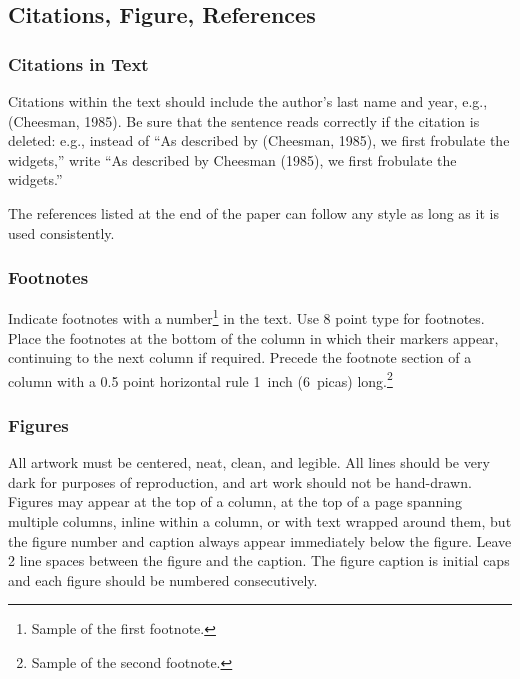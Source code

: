 \documentclass[twoside]{article}
\begin{document}
\subsection{Citations, Figure, References}


\subsubsection{Citations in Text}

Citations within the text should include the author's last name and
year, e.g., (Cheesman, 1985). 
Be sure that the sentence reads
correctly if the citation is deleted: e.g., instead of ``As described
by (Cheesman, 1985), we first frobulate the widgets,'' write ``As
described by Cheesman (1985), we first frobulate the widgets.''


The references listed at the end of the paper can follow any style as long as it is used consistently.


\subsubsection{Footnotes}

Indicate footnotes with a number\footnote{Sample of the first
  footnote.} in the text. Use 8 point type for footnotes. Place the
footnotes at the bottom of the column in which their markers appear,
continuing to the next column if required. Precede the footnote
section of a column with a 0.5 point horizontal rule 1~inch (6~picas)
long.\footnote{Sample of the second footnote.}

\subsubsection{Figures}

All artwork must be centered, neat, clean, and legible.  All lines
should be very dark for purposes of reproduction, and art work should
not be hand-drawn.  Figures may appear at the top of a column, at the
top of a page spanning multiple columns, inline within a column, or
with text wrapped around them, but the figure number and caption
always appear immediately below the figure.  Leave 2 line spaces
between the figure and the caption. The figure caption is initial caps
and each figure should be numbered consecutively.
\end{document}
